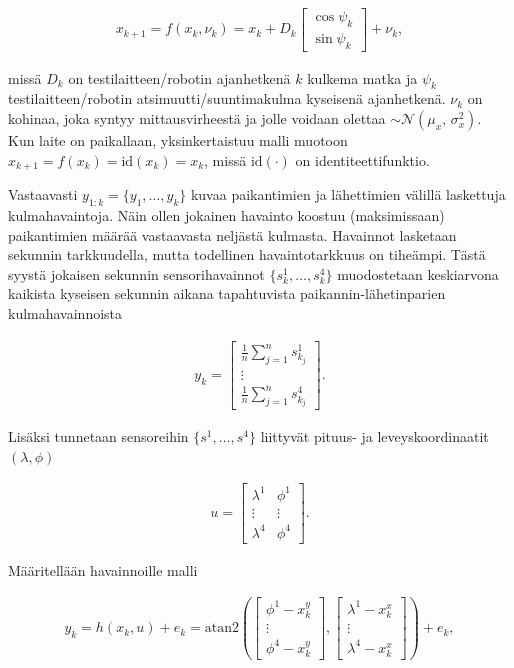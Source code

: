 \documentclass[
  12pt,
  a4paper, twoside]{book}
\begin{document}
\begin{align}\label{tilamalli-liikkuva}
x_{k+1}=f(x_k, \nu_k)=x_k+D_k \begin{bmatrix} \cos\psi_k \\ \sin\psi_k \end{bmatrix}+\nu_k,
\end{align}

\noindent missä \(D_k\) on testilaitteen/robotin ajanhetkenä \(k\) kulkema matka ja \(\psi_k\) testilaitteen/robotin atsimuutti/suuntimakulma kyseisenä ajanhetkenä. \(\nu_k\) on kohinaa, joka syntyy mittausvirheestä ja jolle voidaan olettaa \(\sim \mathcal{N}(\mu_x,\,\sigma_x^{2})\). Kun laite on paikallaan, yksinkertaistuu malli muotoon \(x_{k+1}=f(x_k)=\text{id}(x_k)=x_k\), missä \(\text{id}(\cdot)\) on identiteettifunktio.

Vastaavasti \(y_{1:k}=\{y_1,\ldots,y_k\}\) kuvaa paikantimien ja lähettimien välillä laskettuja kulmahavaintoja. Näin ollen jokainen havainto koostuu (maksimissaan) paikantimien määrää vastaavasta neljästä kulmasta. Havainnot lasketaan sekunnin tarkkuudella, mutta todellinen havaintotarkkuus on tiheämpi. Tästä syystä jokaisen sekunnin sensorihavainnot \(\{s_k^1,\ldots,s_k^4\}\) muodostetaan keskiarvona kaikista kyseisen sekunnin aikana tapahtuvista paikannin-lähetinparien kulmahavainnoista

\begin{align}
y_k=\begin{bmatrix} \frac{1}{n}\sum_{j=1}^ns^1_{k_j}\\   \vdots \\ \frac{1}{n}\sum_{j=1}^ns^4_{k_j} \end{bmatrix}.
\end{align}

\noindent Lisäksi tunnetaan sensoreihin \(\{s^1,\ldots,s^4\}\) liittyvät pituus- ja leveyskoordinaatit \((\lambda, \phi)\)

\begin{align}
u=\begin{bmatrix} \lambda^1 & \phi^1 \\   \vdots & \vdots \\ \lambda^4 & \phi^4 \end{bmatrix}.
\end{align}

Määritellään havainnoille malli

\begin{align}\label{havaintomalli}
y_k=h(x_k, u)+e_k=\text{atan2}(\begin{bmatrix}\phi^1-x_k^y\\ \vdots \\ \phi^4-x_k^y\end{bmatrix}, \begin{bmatrix}\lambda^1-x_k^x\\ \vdots \\ \lambda^4-x_k^x\end{bmatrix})+e_k,
\end{align}
\end{document}
